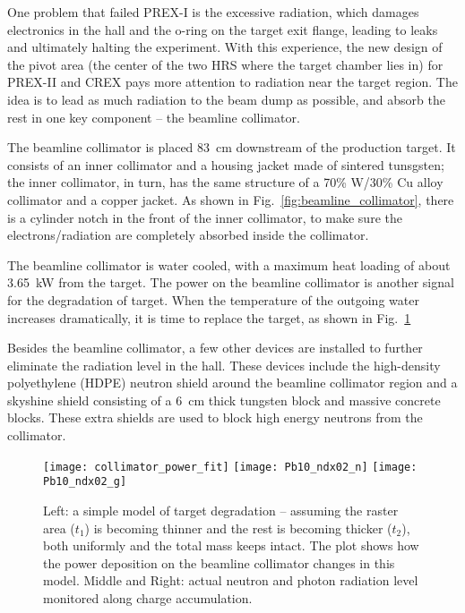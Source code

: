 One problem that failed PREX-I is the excessive radiation, which damages
electronics in the hall and the o-ring on the target exit flange, leading to
leaks and ultimately halting the experiment.
With this experience, the new design of the pivot area (the center of the two HRS 
where the target chamber lies in) for PREX-II and CREX pays more attention
to radiation near the target region. The idea is to lead as much radiation to
the beam dump as possible, and absorb the rest in one key component --
the beamline collimator. 

The beamline collimator is placed 83~cm downstream of the production 
target. It consists of an inner collimator and a housing
jacket made of sintered tunsgsten; the inner collimator, in turn, has the same 
structure of a 70\% W/30\% Cu alloy collimator and a copper jacket. As shown
in Fig.~\ref{fig:beamline_collimator}, there is a cylinder notch in the front of
the inner collimator, to make sure the electrons/radiation are completely 
absorbed inside the collimator. 

The beamline collimator is water cooled, with a maximum heat loading of about 
3.65~kW from the \Pb target. The power on the beamline
collimator is another signal for the degradation of target. When the temperature 
of the outgoing water increases dramatically, it is time to replace the \Pb target,
as shown in Fig.~\ref{fig:collimator_see_target_degradation}

Besides the beamline collimator, a few other devices are installed 
to further eliminate the radiation level in the hall. These devices include the 
high-density polyethylene (HDPE) neutron shield around the beamline collimator
region and a skyshine shield consisting of a 6~cm thick tungsten block and
massive concrete blocks. These extra shields are used to block high energy
neutrons from the collimator.

\begin{figure}[!h]
    \texttt{[image: collimator\_power\_fit]}
    \texttt{[image: Pb10\_ndx02\_n]}
    \texttt{[image: Pb10\_ndx02\_g]}
    \caption{Left: a simple model of target degradation -- assuming the raster 
    area ($t_1$) is becoming thinner and the rest is becoming thicker ($t_2$),
    both uniformly and the total mass keeps intact. The plot shows how the power 
    deposition on the beamline collimator changes in this model. Middle and Right: actual
    neutron and photon radiation level monitored along charge accumulation.
    }
    \label{fig:collimator_see_target_degradation}
\end{figure}

